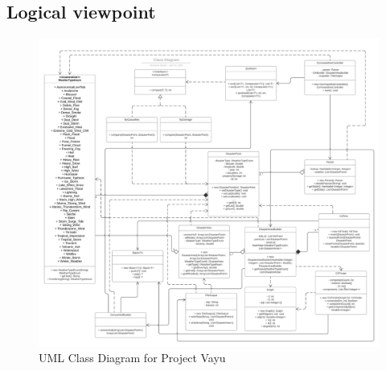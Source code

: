 \documentclass[12pt]{article}
\begin{document}
                
            
        \subsection{Logical viewpoint}%
        \noindent \begin{figure}
            \includegraphics[scale=0.5]{UML_Class_Diagram.png}
            \caption{UML Class Diagram for Project Vayu}
            \label{fig:my_label}
        \end{figure}
                
\end{document}

